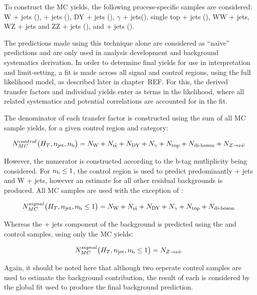 To construct the MC yields, the following process-specific samples are considered:
W + jets (\numw),
\ttbar + jets (\numtt), DY + jets (\numdy), $\gamma$ + jets(\numgam),
single top + jets (\numtop), WW + jets, WZ + jets and ZZ + jets (\numdibo), and
\zinv + jets (\numzinv).

The predictions made using this technique alone are considered as ``na\"{i}ve'' 
predictions and are only used in analysis development and background systematics
derivation. In order to determine final yields for use in interpretation and 
limit-setting, a fit is made across all signal and control regions, using the 
full likelihood model, as described later in chapter~REF. For this, the derived 
transfer factors and individual yields enter as terms in the likelihood, where 
all related systematics and potential correlations are accounted for in the fit. 

The denominator of each transfer factor is constructed using the sum of all MC
sample yields, for a given control region and category:

\begin{equation}
N_{MC}^{control}\big(H_T, n_{\text{jet}}, n_{\text{b}}\big) = N_{\text{W}} + N_{\text{t}\bar{\text{t}}} + N_{\text{DY}} + N_{\gamma} + 
N_{\text{top}} + N_{\text{di-boson}} + N_{Z \to \nu\bar{\nu}}
\label{eq:trans_fact_denom}
\end{equation}

However, the numerator is constructed according to the b-tag mutliplicity being 
considered. For $n_{\text{b}} \leq 1$, the \mj control region is used to predict 
predominantly \ttbar + jets and W + jets, however an estimate for all other 
residual backgrounds is produced. All MC samples are used with the exception of
\zinv:

\begin{equation}
N_{MC}^{signal}\big(H_T, n_{\text{jet}}, n_{\text{b}} \leq 1\big) = N_{\text{W}} + N_{\text{t}\bar{\text{t}}} + N_{\text{DY}} + N_{\gamma} + 
N_{\text{top}} + N_{\text{di-boson}}
\label{eq:trans_fact_num_le1b_noz}
\end{equation}

Whereas the \zinv + jets component of the background is predicted using the \mmj
and \gj control samples, using only the \zinv MC yields:

\begin{equation}
N_{MC}^{signal}\big(H_T, n_{\text{jet}}, n_{\text{b}} \leq 1 \big) = N_{Z \to \nu\bar{\nu}}
\label{eq:trans_fact_num_le1b_z}
\end{equation}

Again, it should be noted here that although two seperate control samples are 
used to estimate the \zinv background contribution, the result of each is
considered by the global fit used to produce the final background prediction.

